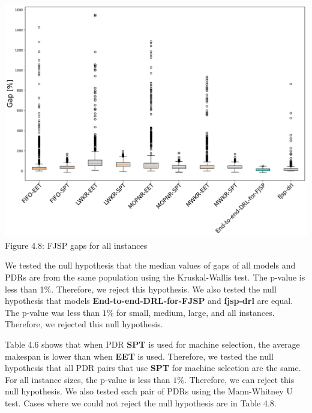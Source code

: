 \begin{center}
    \includegraphics[width=0.9\linewidth]{images/horizontal_boxplot_fjsp_all.pdf}\\
    Figure 4.8: FJSP gaps for all instances
\end{center}

We tested the null hypothesis that the median values of gaps of all models and PDRs are from the same population using the Kruskal-Wallis test. The p-value is less than 1$\%$. Therefore, we reject this hypothesis. We also tested the null hypothesis that models \textbf{End-to-end-DRL-for-FJSP} and \textbf{fjsp-drl} are equal. The p-value was less than $1\%$ for small, medium, large, and all instances. Therefore, we rejected this null hypothesis. 
\par
Table 4.6 shows that when PDR \textbf{SPT} is used for machine selection, the average makespan is lower than when \textbf{EET} is used. Therefore, we tested the null hypothesis that all PDR pairs that use \textbf{SPT} for machine selection are the same. For all instance sizes, the p-value is less than $1\%$. Therefore, we can reject this null hypothesis. We also tested each pair of PDRs using the Mann-Whitney U test. Cases where we could not reject the null hypothesis are in Table 4.8.

